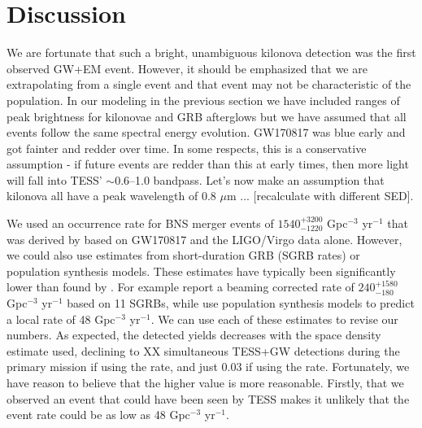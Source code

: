 \documentclass[modern]{aastex61}
\begin{document}
\section{Discussion}
We are fortunate that such a bright, unambiguous kilonova detection was the first observed GW+EM event. However, it should be emphasized that we are extrapolating from a single event and that event may not be characteristic of the population. In our modeling in the previous section we have included ranges of peak brightness for kilonovae and GRB afterglows but we have assumed that all events follow the same spectral energy evolution. GW170817 was blue early and got fainter and redder over time. In some respects, this is a conservative assumption - if future events are redder than this at early times, then more light will fall into TESS' $\sim$0.6--1.0 bandpass. Let's now make an assumption that kilonova all have a peak wavelength of 0.8 $\mu$m ... [recalculate with different SED].


We used an occurrence rate for BNS merger events of $1540^{+3200}_{-1220}$ Gpc$^{-3}$ yr$^{-1}$ that was derived by \citet{Abbott2017a} based on GW170817 and the LIGO/Virgo data alone. However, we could also use estimates from short-duration GRB (SGRB rates) or population synthesis models. These estimates have typically been significantly lower than found by \citet{Abbott2017a}. For example \citet{Fong2015} report a beaming corrected rate of $240^{+1580}_{-180}$ Gpc$^{-3}$ yr$^{-1}$ based on 11 SGRBs, while \citet{Chruslinska2017} use population synthesis models to predict a local rate of 48 Gpc$^{-3}$ yr$^{-1}$. We can use each of these estimates to revise our numbers. As expected, the detected yields decreases with the space density estimate used, declining to XX simultaneous TESS+GW detections during the primary mission if using the \citet{Fong2015} rate, and just 0.03 if using the \citet{Chruslinska2017} rate. Fortunately, we have reason to believe that the higher value is more reasonable. Firstly, that we observed an event that could have been seen by TESS makes it unlikely that the event rate could be as low as 48 Gpc$^{-3}$ yr$^{-1}$.
\end{document}
